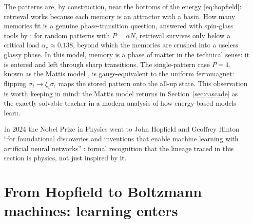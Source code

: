 The patterns are, by construction, near the bottoms of the energy
\eqref{eq:hopfield}: retrieval works because each memory is an attractor
with a basin. How many memories fit is a genuine phase-transition
question, answered with spin-glass tools by \citet{amit1985storing}: for
random patterns with $P = \alpha N$, retrieval survives only below a
critical load $\alpha_c \approx 0.138$, beyond which the memories are
crushed into a useless glassy phase. In this model, memory is a phase
of matter in the technical sense: it is entered and left through sharp
transitions. The
single-pattern case $P=1$, known as the Mattis model
\citep{mattis1976solvable}, is gauge-equivalent to the uniform
ferromagnet: flipping $\sigma_i \to \xi_i \sigma_i$ maps the stored
pattern onto the all-up state. This observation is worth keeping in mind:
the Mattis model returns in Section~\ref{sec:cascade} as the exactly
solvable teacher in a modern analysis of how energy-based models learn.

In 2024 the Nobel Prize in Physics went to John Hopfield and Geoffrey
Hinton ``for foundational discoveries and inventions that enable machine
learning with artificial neural networks'' \citep{nobel2024physics}:
formal recognition that the lineage traced in this section is physics,
not just inspired by it.

\section{From Hopfield to Boltzmann machines: learning enters}
\label{sec:boltzmann-machines}

